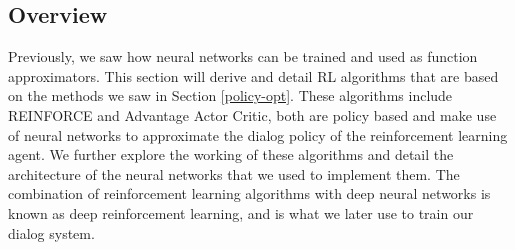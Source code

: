 \documentclass[12pt]{extarticle}
\numberwithin{equation}{section}
\begin{document}
	\subsection{Overview}
	Previously, we saw how neural networks can be trained and used as function approximators. This section will derive and detail RL algorithms that are based on the methods we saw in Section \ref{policy-opt}. These algorithms include REINFORCE and Advantage Actor Critic, both are policy based and make use of neural networks to approximate the dialog policy of the reinforcement learning agent. We further explore the working of these algorithms and detail the architecture of the neural networks that we used to implement them. The combination of reinforcement learning algorithms with deep neural networks is known as deep reinforcement learning, and is what we later use to train our dialog system.
\end{document}

